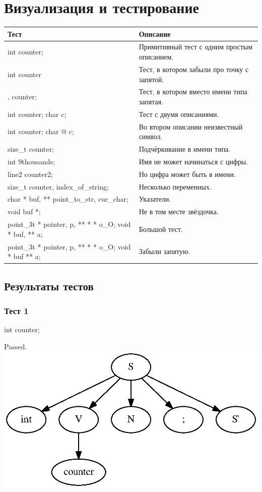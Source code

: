\section{Визуализация и тестирование}

\begin{tabular}{| l | l |}
    \hline
    \textbf{Тест} & \textbf{Описание} \\
    \hline
    int counter; & Примитивный тест с одним простым описанием. \\
    \hline
    int counter & Тест, в котором забыли про точку с запятой. \\
    \hline
    , counter; & Тест, в котором вместо имени типа запятая. \\
    \hline
    int counter; char c; & Тест с двумя описаниями. \\
    \hline
    int counter; char @ c; & Во втором описании неизвестный символ. \\
    \hline
    size\_t counter;  & Подчёркивание в имени типа. \\
    \hline
    int 9thousands;  & Имя не может начинаться с цифры. \\
    \hline
    line2 counter2;  & Но цифра может быть в имени. \\
    \hline
    size\_t counter, index\_of\_string;  & Несколько переменных. \\
    \hline
    char * buf, ** point\_to\_str, cur\_char;  & Указатели. \\
    \hline
    void buf *;  & Не в том месте звёздочка. \\
    \hline
    point\_3t * pointer, p, ** * * o\_O; void * buf, ** a;  & Большой тест. \\
    \hline
    point\_3t * pointer, p, ** * * o\_O; void * buf ** a;  & Забыли запятую. \\
    \hline
\end{tabular}

\subsection{Результаты тестов}

\subsubsection{Тест 1}
int counter;

Passed.
\includegraphics[width=\textwidth]{graph1.eps}

